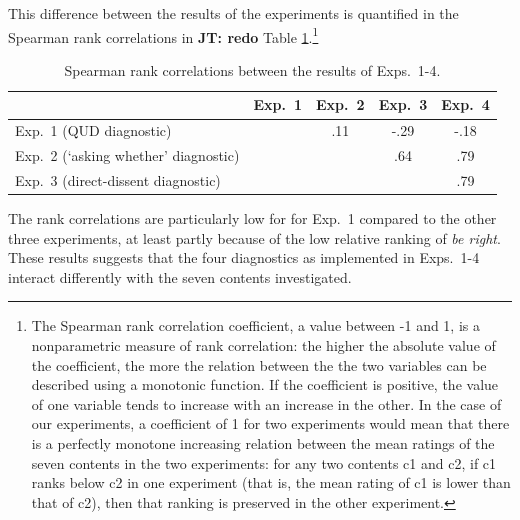 \documentclass[times,linguex,xcolor]{glossa}
\begin{document}
    This difference between the results of the experiments is quantified in the Spearman rank correlations in {\bf JT: redo}  Table \ref{t:spearman}.\footnote{The Spearman rank correlation coefficient, a value between -1 and 1, is a nonparametric measure of rank correlation: the higher the absolute value of the coefficient, the more the relation between the the two variables can be described using a monotonic function. If the coefficient is positive, the value of one variable tends to increase with an increase in the other. In the case of our experiments, a coefficient of 1 for two experiments would mean that there is a perfectly monotone increasing relation between the mean ratings of the seven contents in the two experiments: for any two contents c1 and c2, if c1 ranks below c2 in one experiment (that is, the mean rating of c1 is lower than that of c2), then that ranking is preserved in the other experiment.}

    \begin{table}[ht!]
      \centering
      \begin{tabular}{l | c c c c}
      & Exp.~1 & Exp.~2 & Exp.~3 & Exp.~4 \\ \hline
      Exp.~1 (QUD diagnostic) & \cellcolor{lightgray} & .11 & -.29 & -.18 \\
      Exp.~2 (`asking whether' diagnostic) & \cellcolor{lightgray} & \cellcolor{lightgray} & .64 &.79 \\
      Exp.~3 (direct-dissent diagnostic) & \cellcolor{lightgray}& \cellcolor{lightgray} & \cellcolor{lightgray} & .79  \\
      \hline
      \end{tabular}
    \caption{Spearman rank correlations between the results of Exps.~1-4.}\label{t:spearman}
    \end{table}

    The rank correlations are particularly low for for Exp.~1 compared to the other three experiments, at least partly because of the low relative ranking of \emph{be right}. These results suggests that the four diagnostics as implemented in Exps.~1-4 interact differently with the seven contents investigated.
\end{document}
